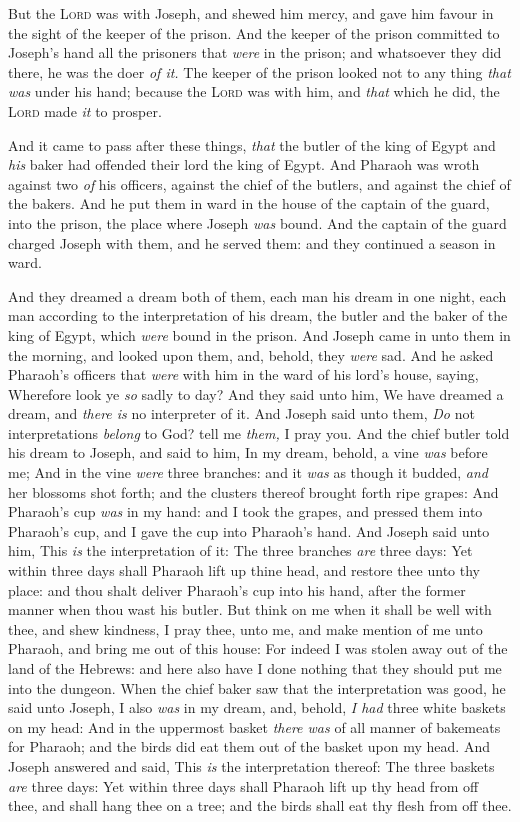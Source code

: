 \documentclass[11pt,letterpaper,oneside]{memoir}
\begin{document}
But the \textsc{Lord} was with Joseph, and shewed him mercy, and gave him
favour in the sight of the keeper of the prison. And the keeper of the
prison committed to Joseph's hand all the prisoners that \emph{were} in
the prison; and whatsoever they did there, he was the doer \emph{of it.
}The keeper of the prison looked not to any thing \emph{that was} under his
hand; because the \textsc{Lord} was with him, and \emph{that} which he
did, the \textsc{Lord} made \emph{it} to prosper.

And it came to pass after these things, \emph{that} the butler of the
king of Egypt and \emph{his} baker had offended their lord the king of
Egypt. And Pharaoh was wroth against two \emph{of} his officers, against
the chief of the butlers, and against the chief of the bakers. And he
put them in ward in the house of the captain of the guard, into the
prison, the place where Joseph \emph{was} bound. And the captain of the
guard charged Joseph with them, and he served them: and they continued a
season in ward.

And they dreamed a dream both of them, each man his dream in one night,
each man according to the interpretation of his dream, the butler and
the baker of the king of Egypt, which \emph{were} bound in the prison.
And Joseph came in unto them in the morning, and looked upon them, and,
behold, they \emph{were} sad. And he asked Pharaoh's officers that
\emph{were} with him in the ward of his lord's house, saying, Wherefore
look ye \emph{so} sadly to day? And they said unto him, We have dreamed
a dream, and \emph{there is} no interpreter of it. And Joseph said unto
them, \emph{Do} not interpretations \emph{belong} to God? tell me
\emph{them,} I pray you. And the chief butler told his dream to Joseph,
and said to him, In my dream, behold, a vine \emph{was} before me; And
in the vine \emph{were} three branches: and it \emph{was} as though it
budded, \emph{and} her blossoms shot forth; and the clusters thereof
brought forth ripe grapes: And Pharaoh's cup \emph{was} in my hand: and
I took the grapes, and pressed them into Pharaoh's cup, and I gave the
cup into Pharaoh's hand. And Joseph said unto him, This \emph{is} the
interpretation of it: The three branches \emph{are} three days: Yet
within three days shall Pharaoh lift up thine head, and restore thee
unto thy place: and thou shalt deliver Pharaoh's cup into his hand,
after the former manner when thou wast his butler. But think on me when
it shall be well with thee, and shew kindness, I pray thee, unto me, and
make mention of me unto Pharaoh, and bring me out of this house: For
indeed I was stolen away out of the land of the Hebrews: and here also
have I done nothing that they should put me into the dungeon. When the
chief baker saw that the interpretation was good, he said unto Joseph, I
also \emph{was} in my dream, and, behold, \emph{I had} three white
baskets on my head: And in the uppermost basket \emph{there was} of all
manner of bakemeats for Pharaoh; and the birds did eat them out of the
basket upon my head. And Joseph answered and said, This \emph{is} the
interpretation thereof: The three baskets \emph{are} three days: Yet
within three days shall Pharaoh lift up thy head from off thee, and
shall hang thee on a tree; and the birds shall eat thy flesh from off
thee.
\end{document}
